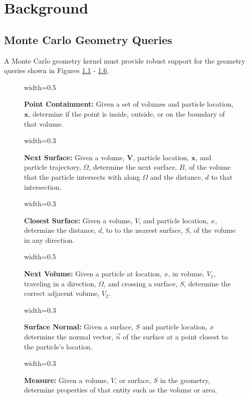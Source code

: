 \newcommand{\geomQuery}[4] {
  \begin{figure}[H]
    \centering
    {width=#3\textwidth}
    \caption[Explanation of the \textit{#1} geometry query]{\textbf{#1:}#4}
    \label{fig:#1}
  \end{figure}
}

\renewcommand{\thefootnote}{\fnsymbol{footnote}}


\chapter{Background}\label{ch:background}

\section{Monte Carlo Geometry Queries}\label{sec:mc-geom-queries}

A Monte Carlo geometry kernel must provide robust support for the geometry
queries shown in Figures \ref{fig:Point Containment} - \ref{fig:Measure}.

\geomQuery{Point Containment}{plc_query}{0.5}{
Given a set of volumes and particle location, $\mathbf{x}$, determine if the
point is inside, outside, or on the boundary of that volume.
}

\geomQuery{Next Surface}{dtb_query}{0.3}{
Given a volume, $\mathbf{V}$, particle location, $\mathbf{x}$, and particle
trajectory, \boldmath$\Omega$, determine the next surface, \boldmath$B$, of the
volume that the particle intersects with along \boldmath$\Omega$ and the
distance, \boldmath$d$ to that intersection.
}

\geomQuery{Closest Surface}{ctl_query}{0.3}{
Given a volume, \boldmath$V$, and particle location, \boldmath$x$, determine
the distance, \boldmath$d$, to to the nearest surface, \boldmath$S$, of the
volume in any direction.
}

\geomQuery{Next Volume}{next_vol_query}{0.5}{
Given a particle at location, \boldmath$x$, in volume, \boldmath$V_1$, traveling
in a direction, \boldmath$\Omega$, and crossing a surface, \boldmath$S$,
determine the correct adjacent volume, \boldmath$V_2$.
}

\geomQuery{Surface Normal}{normal_query}{0.3}{
Given a surface, \boldmath$S$ and particle location, \boldmath$x$ determine
the normal vector, \boldmath$\vec{n}$ of the surface at a point closest to the
particle's location.
}

\geomQuery{Measure}{measure_query}{0.3}{
Given a volume, \boldmath$V$, or surface, \boldmath$S$ in the geometry,
determine properties of that entity such as the volume or area.
}

